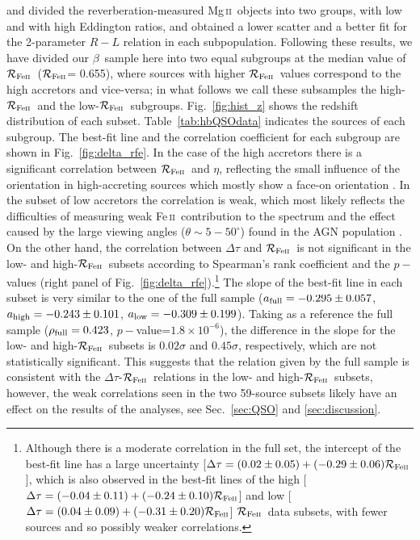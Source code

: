 \documentclass[a4paper,fleqn,usenatbib]{mnras}
\newcommand{\rfe}{${\cal R}_{\rm{Fe\textsc{ii}}}$}
\newcommand{\Feii}{Fe\,\textsc{ii}}
\newcommand{\Mgii}{Mg\,\textsc{ii}}
\newcommand{\hb}{{\sc{H}}$\beta$\/}
\begin{document}
\citet{Mary2020} and \citet{Michal2021} divided the reverberation-measured \Mgii\ objects into two groups, with low and with high Eddington ratios, and obtained a lower scatter and a better fit for the 2-parameter $R-L$ relation in each subpopulation. Following these results, we have divided our \hb\ sample here into two equal subgroups at the median value of \rfe\ (\rfe = 0.655), where sources with higher \rfe\ values correspond to the high accretors and vice-versa; in what follows we call these subsamples the high-\rfe\ and the low-\rfe\ subgroups. Fig.~\ref{fig:hist_z} shows the redshift distribution of each subset. Table~\ref{tab:hbQSOdata} indicates the sources of each subgroup. The best-fit line and the correlation coefficient for each subgroup are shown in Fig.~\ref{fig:delta_rfe}. In the case of the high accretors there is a significant correlation between \rfe\ and $\eta$, reflecting the small influence of the orientation in high-accreting sources which  mostly show a face-on orientation \citep{panda2019,marziani2021}. In the subset of low accretors the correlation is weak, which most likely reflects the difficulties of measuring weak \Feii\ contribution to the spectrum and the effect caused by the large viewing angles ($\theta \sim 5-50^{\circ}$) found in the AGN population \citep{marziani2021}. On the other hand, the correlation between $\Delta \tau$ and \rfe\ is not significant in the low- and high-\rfe\ subsets according to Spearman's rank coefficient and the $p-$values (right panel of Fig.~\ref{fig:delta_rfe}).\footnote{Although there is a moderate correlation in the full set, the intercept of the best-fit line has a large uncertainty [$\Delta \tau=(0.02\pm0.05)+(-0.29\pm0.06){\cal R}_{\rm{Fe\textsc{ii}}}$], which is also observed in the best-fit lines of the high [$\Delta \tau=(-0.04\pm0.11)+(-0.24\pm0.10){\cal R}_{\rm{Fe\textsc{ii}}}$] and low [$\Delta \tau=(0.04\pm0.09)+(-0.31\pm0.20){\cal R}_{\rm{Fe\textsc{ii}}}$] \rfe\ data subsets, with fewer sources and so possibly weaker correlations.} The slope of the best-fit line in each subset is very similar to the one of the full sample ($a_{\rm full}=-0.295\pm0.057$, $a_{\rm high}=-0.243\pm0.101$, $a_{\rm low}=-0.309\pm0.199$). Taking as a reference the full sample ($\rho_{\rm full}=0.423$, $p-$value=$1.8\times10^{-6}$), the difference in the slope for the low- and high-\rfe\ subsets is $0.02\sigma$ and $0.45\sigma$, respectively, which are not statistically significant. This suggests that the relation given by the full sample is consistent with the $\Delta \tau$-\rfe\ relations in the low- and high-\rfe\ subsets, however, the weak correlations seen in the two 59-source subsets likely have an effect on the results of the analyses, see Sec.~\ref{sec:QSO} and \ref{sec:discussion}.
\end{document}
